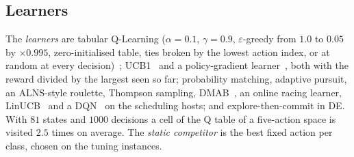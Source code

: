 \documentclass[conference,a4paper]{IEEEtran}
\begin{document}
\subsection{Learners}
\label{sec:learners}
The \emph{learners} are tabular Q-Learning ($\alpha=0.1$, $\gamma=0.9$, $\varepsilon$-greedy from $1.0$ to $0.05$ by $\times0.995$, zero-initialised table, ties broken by the lowest action index, or at random at every decision)~\cite{WatkinsDayan1992}; UCB1~\cite{AuerEtal2002} and a policy-gradient learner~\cite{Williams1992,SuttonBarto2018}, both with the reward divided by the largest seen so far; probability matching, adaptive pursuit, an ALNS-style roulette, Thompson sampling, DMAB~\cite{DaCostaEtal2008}, an online racing learner, LinUCB~\cite{LiEtAl2010} and a DQN~\cite{MnihEtAl2015} on the scheduling hosts; and explore-then-commit in DE.
With $81$ states and $1000$ decisions a cell of the Q table of a five-action space is visited $2.5$ times on average.
The \emph{static competitor} is the best fixed action per class, chosen on the tuning instances.
\end{document}
